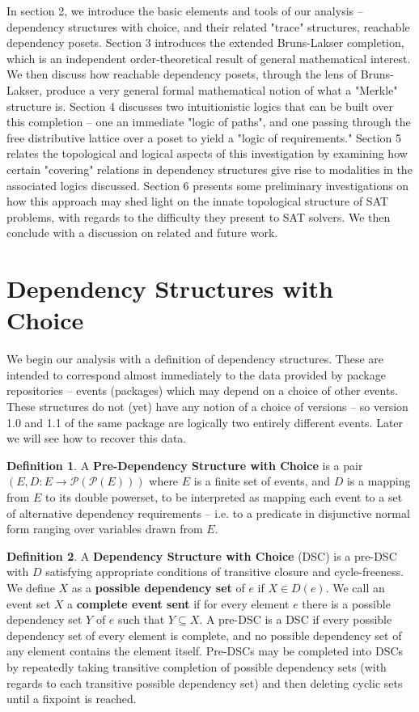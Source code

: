 \documentclass[hoptionsi,review,format=acmsmall]{acmart}
\theoremstyle{definition}
\newtheorem{definition}{Definition}[section]
\newcommand{\Pc}{\mathcal{P}}
\begin{document}
In section 2, we introduce the basic elements and tools of our analysis -- dependency structures with choice, and their related "trace" structures, reachable dependency posets. Section 3 introduces the extended Bruns-Lakser completion, which is an independent order-theoretical result of general mathematical interest. We then discuss how reachable dependency posets, through the lens of Bruns-Lakser, produce a very general formal mathematical notion of what a "Merkle" structure is. Section 4 discusses two intuitionistic logics that can be built over this completion -- one an immediate "logic of paths", and one passing through the free distributive lattice over a poset to yield a "logic of requirements." Section 5 relates the topological and logical aspects of this investigation by examining how certain "covering" relations in dependency structures give rise to modalities in the associated logics discussed. Section 6 presents some preliminary investigations on how this approach may shed light on the innate topological structure of SAT problems, with regards to the difficulty they present to SAT solvers. We then conclude with a discussion on related and future work.

\section{Dependency Structures with Choice}
We begin our analysis with a definition of dependency structures. These are intended to correspond almost immediately to the data provided by package repositories -- events (packages) which may depend on a choice of other events. These structures do not (yet) have any notion of a choice of versions -- so version 1.0 and 1.1 of the same package are logically two entirely different events. Later we will see how to recover this data.

\begin{definition}
A \textbf{Pre-Dependency Structure with Choice} is a pair \((E, D : E \rightarrow \Pc(\Pc(E)))\) where \(E\) is a finite set of events, and \(D\) is a mapping from \(E\) to its double powerset, to be interpreted as mapping each event to a set of alternative dependency requirements -- i.e. to a predicate in disjunctive normal form ranging over variables drawn from \(E\).
\end{definition}

\begin{definition}
A \textbf{Dependency Structure with Choice} (DSC) is a pre-DSC with \(D\) satisfying  appropriate conditions of transitive closure and cycle-freeness. We define \(X\) as a \textbf{possible dependency set} of \(e\) if \(X \in D(e)\). We call an event set \(X\) a \textbf{complete event sent} if for every element \(e\) there is a possible dependency set \(Y\) of \(e\) such that \(Y \subseteq X\). A pre-DSC is a DSC if every possible dependency set of every element is complete, and no possible dependency set of any element contains the element itself. Pre-DSCs may be completed into DSCs by repeatedly taking transitive completion of possible dependency sets (with regards to each transitive possible dependency set) and then deleting cyclic sets until a fixpoint is reached.
\end{definition}
\end{document}
